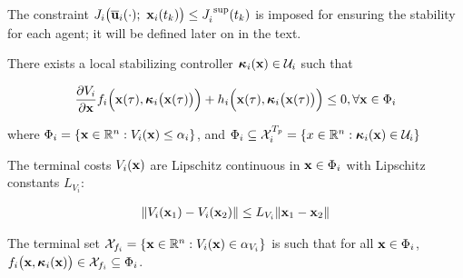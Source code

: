 The constraint $J_i \big(\overline{\bm{\mathbf{u}}}_i (\cdot);\ \bm{\mathbf{x}}_i(t_k)\big) \leq J_i^{\text{ sup}}(t_k)$
is imposed for ensuring the stability for each agent; it will be defined later
on in the text.

\begin{gg_box}
\begin{assumption}

  There exists a local stabilizing controller
  $\bm{\mathbf{\kappa}}_i(\bm{\mathbf{x}}) \in \mathcal{U}_i$ such that

  \begin{align}
    \dfrac{\partial V_i}{\partial \bm{\mathbf{x}}} f_i \Big(\bm{\mathbf{x}}(\tau), \bm{\mathbf{\kappa}}_i\big(\bm{\mathbf{x}}(\tau)\big)\Big) +
      h_i\Big(\bm{\mathbf{x}}(\tau), \bm{\mathbf{\kappa}}_i \big(\bm{\mathbf{x}}(\tau)\big)\Big) \leq 0, \forall \bm{\mathbf{x}} \in \Phi_i
  \end{align}

  where $\Phi_i = \{\bm{\mathbf{x}} \in \mathbb{R}^n : V_i(\bm{\mathbf{x}}) \leq \alpha_i \}$, and
  $\Phi_i \subseteq \mathcal{X}_i^{T_p} = \{x \in \mathbb{R}^n : \bm{\mathbf{\kappa}}_i(\bm{\mathbf{x}}) \in \mathcal{U}_i\}$

  \label{ass:local_controller_k}
\end{assumption}
\end{gg_box}


\begin{gg_box}
\begin{assumption}

  The terminal costs $V_i(\bm{\mathbf{x}})$ are Lipschitz continuous in $\bm{\mathbf{x}} \in \Phi_i$
  with Lipschitz constants $L_{V_i}$:

  \begin{align}
    \| V_i(\bm{\mathbf{x}}_1) - V_i(\bm{\mathbf{x}}_2)\| \leq L_{V_i} \|\bm{\mathbf{x}}_1 - \bm{\mathbf{x}}_2 \|
  \end{align}

  \label{ass:V_i_Lipschitz}
\end{assumption}
\end{gg_box}


\begin{gg_box}
\begin{assumption}

  The terminal set $\mathcal{X}_{f_i} = \{ \bm{\mathbf{x}} \in \mathbb{R}^n : V_i(\bm{\mathbf{x}}) \in \alpha_{V_i}\}$
  is such that for all $\bm{\mathbf{x}} \in \Phi_i$, $f_i\big(\bm{\mathbf{x}}, \bm{\mathbf{\kappa}}_i(\bm{\mathbf{x}})\big) \in \mathcal{X}_{f_i} \subseteq \Phi_i$.

  \label{ass:x_f_i}
\end{assumption}
\end{gg_box}
